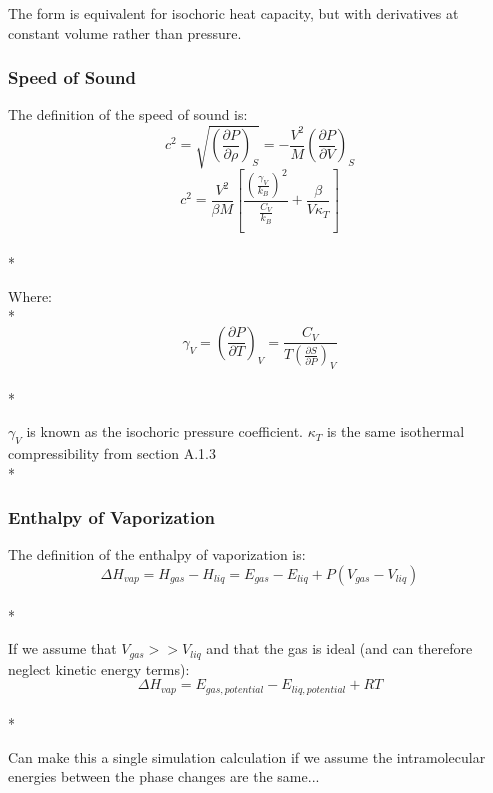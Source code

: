 \documentclass[a4paper,12pt]{article}
\begin{document}
\noindent The form is equivalent for isochoric heat capacity, but with derivatives at constant volume rather than pressure.

\subsubsection{Speed of Sound}
\noindent The definition of the speed of sound is\cite{sos}:
\begin{equation}c^2 = \sqrt{\left(\frac{\partial P}{\partial \rho}\right)_{S}} = -\frac{V^2}{M}\left(\frac{\partial P}{\partial V}\right)_{S}\end{equation}
\begin{equation}c^2 = \frac{V^2}{\beta M}\left[\frac{\left(\frac{\gamma_V}{k_B}\right)^2}{\frac{C_V}{k_B}} + \frac{\beta}{V \kappa_T}\right]\end{equation}\\*

\noindent Where:\\*
\begin{equation}\gamma_V = \left(\frac{\partial P}{\partial T}\right)_{V} = \frac{C_V}{T \left(\frac{\partial S}{\partial P}\right)_{V}}\end{equation}\\*

\noindent $\gamma_V$ is known as the isochoric pressure coefficient. $\kappa_T$ is the same isothermal compressibility from section A.1.3\\*


\subsubsection{Enthalpy of Vaporization}
\noindent The definition of the enthalpy of vaporization is\cite{hvap}:
\begin{equation}\Delta H_{vap} = H_{gas} - H_{liq} = E_{gas} - E_{liq} + P(V_{gas} - V_{liq})\end{equation}\\*

\noindent If we assume that $V_{gas} >> V_{liq}$ and that the gas is ideal (and can therefore neglect kinetic energy terms):
\begin{equation}\Delta H_{vap} = E_{gas, potential} - E_{liq, potential} + R T\end{equation}\\*

\noindent Can make this a single simulation calculation if we assume the intramolecular energies between the phase changes are the same...
\end{document}
